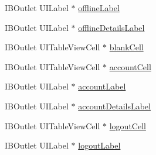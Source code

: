 \begin{DoxyCompactItemize}
\item 
I\-B\-Outlet U\-I\-Label $\ast$ \hyperlink{interface_w_home_view_controller_a63bc1fb8a94199285eb57bb2d99dacff}{offline\-Label}
\item 
I\-B\-Outlet U\-I\-Label $\ast$ \hyperlink{interface_w_home_view_controller_a9338ff1b3f6183eaf77b3c882112777a}{offline\-Details\-Label}
\item 
I\-B\-Outlet U\-I\-Table\-View\-Cell $\ast$ \hyperlink{interface_w_home_view_controller_a8a1ba9ad4992ca7903f63ad940ce1a6c}{blank\-Cell}
\item 
I\-B\-Outlet U\-I\-Table\-View\-Cell $\ast$ \hyperlink{interface_w_home_view_controller_a3631cebe1384dd7912855c6770c6239c}{account\-Cell}
\item 
I\-B\-Outlet U\-I\-Label $\ast$ \hyperlink{interface_w_home_view_controller_a1a333d01227fda540e3380e289cd73e1}{account\-Label}
\item 
I\-B\-Outlet U\-I\-Label $\ast$ \hyperlink{interface_w_home_view_controller_a6528887ddbb4af721c28dc4fd8f1259b}{account\-Details\-Label}
\item 
I\-B\-Outlet U\-I\-Table\-View\-Cell $\ast$ \hyperlink{interface_w_home_view_controller_a6f84bceb501a75c8affd4d4b98275e14}{logout\-Cell}
\item 
I\-B\-Outlet U\-I\-Label $\ast$ \hyperlink{interface_w_home_view_controller_aa0ddc4bc186a555b7abd6ee3d0db329b}{logout\-Label}
\end{DoxyCompactItemize}


